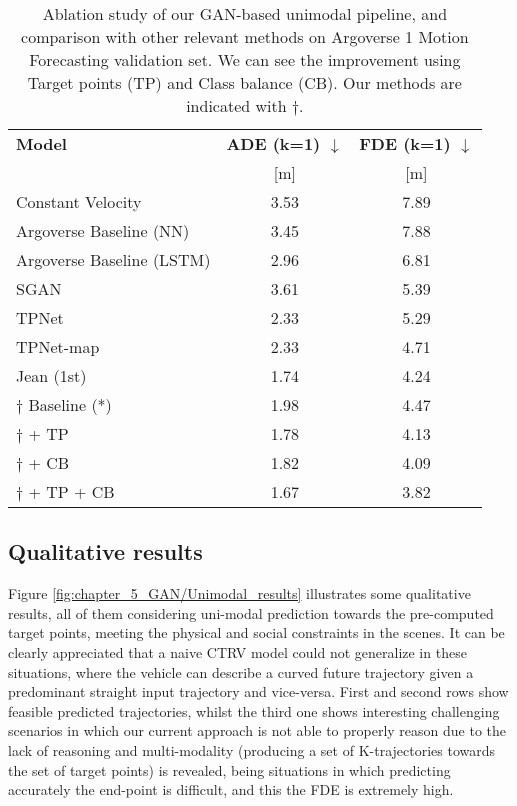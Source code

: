 \begin{table}[!h]
	\captionsetup{justification=justified}
	\caption[Ablation study of our Attention-based GAN unimodal pipeline, and comparison with other relevant methods on Argoverse 1 Motion Forecasting validation set]{Ablation study of our GAN-based unimodal pipeline, and comparison with other relevant methods on Argoverse 1 Motion Forecasting validation set. We can see the improvement using Target points (TP) and Class balance (CB). Our methods are indicated with $\dag$.}
	\begin{center}
		\begin{tabular}{ l | c | c }
			\toprule
			\textbf{Model} & \textbf{ADE (k=1) $\downarrow$} & \textbf{FDE (k=1) $\downarrow$} \\
			& [m] & [m] \\
			\midrule
			Constant Velocity \cite{chang2019argoverse} & 3.53 & 7.89 \\ 
			Argoverse Baseline (NN) \cite{chang2019argoverse} & 3.45  & 7.88 \\ 
			Argoverse Baseline (LSTM) \cite{chang2019argoverse} & 2.96  & 6.81 \\ 
			SGAN \cite{gupta2018social} & 3.61  & 5.39 \\ 
			TPNet \cite{fang2020tpnet} & 2.33  & 5.29 \\ 
			TPNet-map \cite{fang2020tpnet} & 2.33  & 4.71 \\ 
			Jean (1st) \cite{chang2019argoverse, mercat2020multi} & 1.74  & 4.24 \\ 
			\midrule 
			$\dag$ Baseline (*) & 1.98  & 4.47 \\ 
			$\dag$ + TP & 1.78  & 4.13 \\
			$\dag$ + CB & 1.82  & 4.09 \\
			$\dag$ + TP + CB & 1.67  & 3.82 \\
			\hline
		\end{tabular}
		\label{table:5_model_results_test}
	\end{center}
\end{table}

\subsection{Qualitative results}
\label{subsec:5_qualitative_results}

Figure \ref{fig:chapter_5_GAN/Unimodal_results} illustrates some qualitative results, all of them considering uni-modal prediction towards the pre-computed target points, meeting the physical and social constraints in the scenes. It can be clearly appreciated that a naive \ac{CTRV} model could not generalize in these situations, where the vehicle can describe a curved future trajectory given a predominant straight input trajectory and vice-versa. First and second rows show feasible predicted trajectories, whilst the third one shows interesting challenging scenarios in which our current approach is not able to properly reason due to the lack of reasoning and multi-modality (producing a set of K-trajectories towards the set of target points) is revealed, being situations in which predicting accurately the end-point is difficult, and this the \ac{FDE} is extremely high. 

